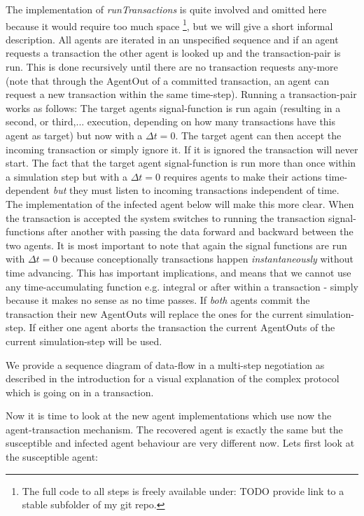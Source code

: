 The implementation of \textit{runTransactions} is quite involved and omitted here because it would require too much space \footnote{The full code to all steps is freely available under: TODO provide link to a stable subfolder of my git repo.}, but we will give a short informal description.
All agents are iterated in an unspecified sequence and if an agent requests a transaction the other agent is looked up and the transaction-pair is run. This is done recursively until there are no transaction requests any-more (note that through the AgentOut of a committed transaction, an agent can request a new transaction within the same time-step). Running a transaction-pair works as follows:
The target agents signal-function is run again (resulting in a second, or third,... execution, depending on how many transactions have this agent as target) but now with a $\Delta t = 0$. The target agent can then accept the incoming transaction or simply ignore it. If it is ignored the transaction will never start. The fact that the target agent signal-function is run more than once within a simulation step but with a $\Delta t = 0$ requires agents to make their actions time-dependent \textit{but} they must listen to incoming transactions independent of time. The implementation of the infected agent below will make this more clear.
When the transaction is accepted the system switches to running the transaction signal-functions after another with passing the data forward and backward between the two agents. It is most important to note that again the signal functions are run with $\Delta t = 0$ because conceptionally transactions happen \textit{instantaneously} without time advancing. This has important implications, and means that we cannot use any time-accumulating function e.g. integral or after within a transaction - simply because it makes no sense as no time passes. If \textit{both} agents commit the transaction their new AgentOuts will replace the ones for the current simulation-step. If either one agent aborts the transaction the current AgentOuts of the current simulation-step will be used.

We provide a sequence diagram of data-flow in a multi-step negotiation as described in the introduction for a visual explanation of the complex protocol which is going on in a transaction.

Now it is time to look at the new agent implementations which use now the agent-transaction mechanism. The recovered agent is exactly the same but the susceptible and infected agent behaviour are very different now. Lets first look at the susceptible agent:

